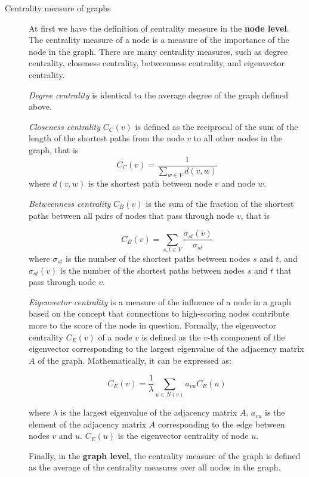 \documentclass{article}
\begin{document}
\begin{description}
    \item [Centrality measure of graphs] At first we have the definition of centrality measure in the \textbf{node level}. The centrality measure of a node is a measure of the importance of the node in the graph. There are many centrality measures, such as degree centrality, closeness centrality, betweenness centrality, and eigenvector centrality. 
    
    \textit{Degree centrality} is identical to the average degree of the graph defined above. 
    
    \textit{Closeness centrality} $C_C(v)$ is defined as the reciprocal of the sum of the length of the shortest paths from the node $v$ to all other nodes in the graph, that is 
    $$C_C(v) = \frac{1}{\sum_{w\in V}{d(v ,w)}}$$
    where $d(v, w)$ is the shortest path between node $v$ and node $w$. 
    
    \textit{Betweenness centrality} $C_B(v)$ is the sum of the fraction of the shortest paths between all pairs of nodes that pass through node $v$, that is
    
    $$
        C_B(v) = \sum_{s,t \in V} \frac{\sigma_{st}(v)}{\sigma_{st}}
    $$
    where $\sigma_{st}$ is the number of the shortest paths between nodes $s$ and $t$, and $\sigma_{st}(v)$ is the number of the shortest paths between nodes $s$ and $t$ that pass through node $v$.
    
    \textit{Eigenvector centrality} is a measure of the influence of a node in a graph based on the concept that connections to high-scoring nodes contribute more to the score of the node in question. Formally, the eigenvector centrality $C_E(v)$ of a node $v$  is defined as the $v$-th component of the eigenvector corresponding to the largest eigenvalue of the adjacency matrix $A$ of the graph. Mathematically, it can be expressed as:
    
    \[ C_E(v) = \frac{1}{\lambda} \sum_{u \in N(v)} a_{vu} C_E(u) \]
    
    where $ \lambda$ is the largest eigenvalue of the adjacency matrix $A$.
$a_{vu}$ is the element of the adjacency matrix $A$ corresponding to the edge between nodes $v$  and $u$.
$ C_E(u)$  is the eigenvector centrality of node $u$.


    Finally, in the \textbf{graph level}, the centrality measure of the graph is defined as the average of the centrality measures over all nodes in the graph.


\end{description}
\end{document}
